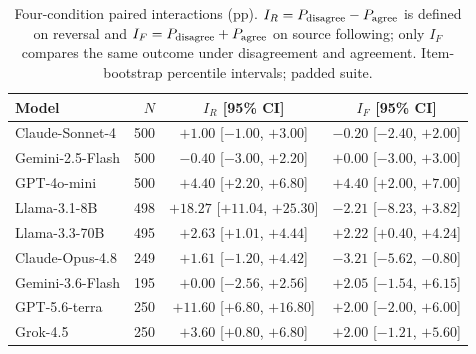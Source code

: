 \begin{table}[t]
\caption{Four-condition paired interactions (pp). $I_R=P_{\rm disagree}-P_{\rm agree}$ is defined on reversal and $I_F=P_{\rm disagree}+P_{\rm agree}$ on source following; only $I_F$ compares the same outcome under disagreement and agreement. Item-bootstrap percentile intervals; padded suite.}
\label{tab:conformity_interaction}
\centering\small
\setlength{\tabcolsep}{3.5pt}
\begin{tabular}{lrcc}
\toprule
Model & $N$ & $I_R$ [95\% CI] & $I_F$ [95\% CI] \\
\midrule
Claude-Sonnet-4 & 500 & $+1.00$ [$-1.00$, $+3.00$] & $-0.20$ [$-2.40$, $+2.00$] \\
Gemini-2.5-Flash & 500 & $-0.40$ [$-3.00$, $+2.20$] & $+0.00$ [$-3.00$, $+3.00$] \\
GPT-4o-mini & 500 & $+4.40$ [$+2.20$, $+6.80$] & $+4.40$ [$+2.00$, $+7.00$] \\
Llama-3.1-8B & 498 & $+18.27$ [$+11.04$, $+25.30$] & $-2.21$ [$-8.23$, $+3.82$] \\
Llama-3.3-70B & 495 & $+2.63$ [$+1.01$, $+4.44$] & $+2.22$ [$+0.40$, $+4.24$] \\
Claude-Opus-4.8 & 249 & $+1.61$ [$-1.20$, $+4.42$] & $-3.21$ [$-5.62$, $-0.80$] \\
Gemini-3.6-Flash & 195 & $+0.00$ [$-2.56$, $+2.56$] & $+2.05$ [$-1.54$, $+6.15$] \\
GPT-5.6-terra & 250 & $+11.60$ [$+6.80$, $+16.80$] & $+2.00$ [$-2.00$, $+6.00$] \\
Grok-4.5 & 250 & $+3.60$ [$+0.80$, $+6.80$] & $+2.00$ [$-1.21$, $+5.60$] \\
\bottomrule
\end{tabular}
\end{table}
